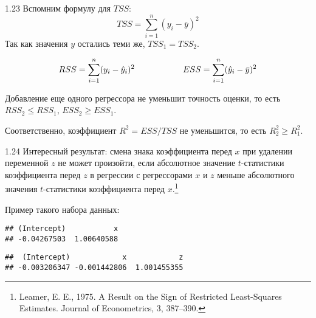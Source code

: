 \protect \hypertarget {soln:1.23}{}
\begin{solution}{{1.23}}
Вспомним формулу для  $TSS$:
\[
TSS = \sum\limits_{i=1}^n (y_i-\bar{y})^2
\]
Так как значения $y$ остались теми же, $TSS_1 = TSS_2$.

\[
RSS = \sum\limits_{i=1}^n (y_i-\hat{y}_i)^2 \hspace{2cm} ESS = \sum\limits_{i=1}^n (\hat{y}_i-\bar{y})^2
\]

Добавление еще одного регрессора не уменьшит точность оценки, то есть $RSS_2\leqslant RSS_1$, $ESS_2 \geqslant ESS_1$.

Соответственно, коэффициент $R^2 = ESS/TSS$ не уменьшится, то есть $R^2_2 \geqslant R^2_1$.

\end{solution}
\protect \hypertarget {soln:1.24}{}
\begin{solution}{{1.24}}
Интересный результат: смена знака коэффициента перед \(x\) при удалении переменной \(z\) не может произойти, если абсолютное значение \(t\)-статистики коэффициента перед \(z\) в регрессии с регрессорами \(x\) и \(z\) меньше абсолютного значения \(t\)-статистики коэффициента перед \(x\).\footnote{Leamer, E. E., 1975. A Result on the Sign of Restricted Least-Squares Estimates. Journal of Econometrics, 3, 387--390.}

Пример такого набора данных:
\begin{knitrout}
\color{fgcolor}\begin{kframe}
\begin{alltt}
 \hlkwb{<-} \hlopt{:}
 \hlkwb{<-}  \hlopt{+} \hlstd{(} \hlstd{,} \hlstd{)}
 \hlkwb{<-}  \hlopt{+} \hlstd{(} \hlstd{,} \hlstd{)}
\hlstd{(} \hlopt{~} 
\end{alltt}
\begin{verbatim}
## (Intercept)           x
## -0.04267503  1.00640588
\end{verbatim}
\begin{alltt}
\hlstd{(} \hlopt{~}  \hlopt{+} 
\end{alltt}
\begin{verbatim}
##  (Intercept)            x            z
## -0.003206347 -0.001442806  1.001455355
\end{verbatim}
\end{kframe}
\end{knitrout}
\end{solution}
